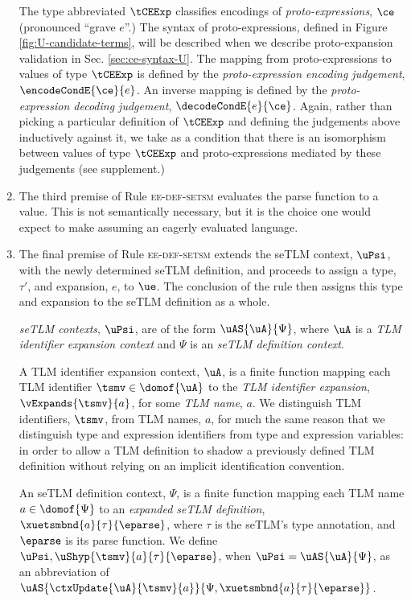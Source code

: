 \documentclass[acmsmall,10pt,review,anonymous]{acmart}\settopmatter{printfolios=true}
\begin{document}
\begin{enumerate}
The type abbreviated $\tCEExp$ classifies encodings of \emph{proto-expressions}, $\ce$ (pronounced ``grave $e$''.) The syntax of proto-expressions, defined in Figure \ref{fig:U-candidate-terms}, will be described when we describe proto-expansion validation in Sec. \ref{sec:ce-syntax-U}. The mapping from proto-expressions to values of type $\tCEExp$ is defined by the \emph{proto-expression encoding judgement}, $\encodeCondE{\ce}{e}$. An inverse mapping is defined by the \emph{proto-expression decoding judgement}, $\decodeCondE{e}{\ce}$. Again, rather than picking a particular definition of $\tCEExp$ and defining the judgements above inductively against it, we take as a condition that there is an isomorphism between values of type $\tCEExp$ and proto-expressions mediated by these judgements (see supplement.)
\item The third premise of Rule \textsc{ee-def-setsm} evaluates the parse function to a value. This is not semantically necessary, but it is the choice one would expect to make assuming an eagerly evaluated language.
\item The final premise of Rule \textsc{ee-def-setsm} extends the seTLM context, $\uPsi$, with the newly determined {seTLM definition}, and proceeds to assign a type, $\tau'$, and expansion, $e$, to $\ue$. The conclusion of the rule then assigns this type and expansion to the seTLM definition as a whole.%



\emph{seTLM contexts}, $\uPsi$, are of the form $\uAS{\uA}{\Psi}$, where $\uA$ is a \emph{TLM identifier expansion context} and $\Psi$ is an \emph{seTLM definition context}. 

A {TLM identifier expansion context}, $\uA$, is a finite function mapping each TLM identifier $\tsmv \in \domof{\uA}$ to the \emph{TLM identifier expansion}, $\vExpands{\tsmv}{a}$, for some \emph{TLM name}, $a$. We distinguish TLM identifiers, $\tsmv$, from TLM names, $a$, for much the same reason that we distinguish type and expression identifiers from type and expression variables: in order to allow a TLM definition to shadow a previously defined TLM definition without relying on an implicit identification convention.

An {seTLM definition context}, $\Psi$, is a finite function mapping each TLM name $a \in \domof{\Psi}$ to an \emph{expanded seTLM definition}, $\xuetsmbnd{a}{\tau}{\eparse}$, where $\tau$ is the seTLM's type annotation, and $\eparse$ is its parse function. 
We define $\uPsi, \uShyp{\tsmv}{a}{\tau}{\eparse}$, when $\uPsi=\uAS{\uA}{\Psi}$, as an abbreviation of $\uAS{\ctxUpdate{\uA}{\tsmv}{a}}{\Psi, \xuetsmbnd{a}{\tau}{\eparse}}$.


\end{enumerate}
\end{document}
